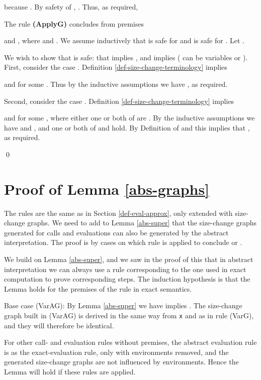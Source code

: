 \documentclass{LMCS}
\newcommand{\vair}{\relax}
\newcommand{\bprf}{\proof}
\newcommand{\eprf}{\qed}
\theoremstyle{definition}\newtheorem{env}[thm]{Environment}
\begin{document}
because .
By safety of , 
.
Thus, as required,



\vair
The rule {\bf (ApplyG)} concludes   
from premises

and
, where
 and .
We assume inductively 
that  is safe for 
and  is safe for .
Let . 


We wish to show that  is safe: that 
 implies
, and
 implies
 ( can be variables or ).
First, consider the case .
Definition \ref{def-size-change-terminology} 
implies

and 
for some . Thus by the inductive assumptions we have
, as required.



Second, consider the case 
.
Definition \ref{def-size-change-terminology} 
implies

and 
for some , where either one or both of  are . 
By the inductive assumptions we have
 and 
, and 
one or both of
 and 
 hold.
By Definition of  and  this implies that 
, as required. 


\eprf



\section{Proof of Lemma \ref{abs-graphs}}

\bprf 
The rules are the same as in Section \ref{def-eval-approx}, 
only extended with size-change graphs. 
We need to add to Lemma \ref{abs-super} that the size-change graphs 
generated for
calls and evaluations can also be generated by the abstract interpretation. 
The proof is by cases on which rule is applied to conclude 
 or . 

We build on Lemma \ref{abs-super}, and we saw in the proof of this that 
in abstract interpretation we can always use a rule corresponding to 
the one used in exact computation to prove corresponding steps. 
The induction hypothesis is that the Lemma holds for the premises of the rule 
in exact semantics. 

Base case (VarAG): By Lemma \ref{abs-super} 
we have  implies 
. The size-change graph built in (VarAG) 
is derived in the same way from {\tt x} and  
as in rule (VarG), and they will therefore be identical.

For other call- and evaluation rules without premises, 
the abstract evaluation rule 
is as the exact-evaluation rule, only with environments removed, and 
the generated size-change graphs 
are not influenced by environments. Hence the Lemma will hold if these rules are applied.
\end{document}
